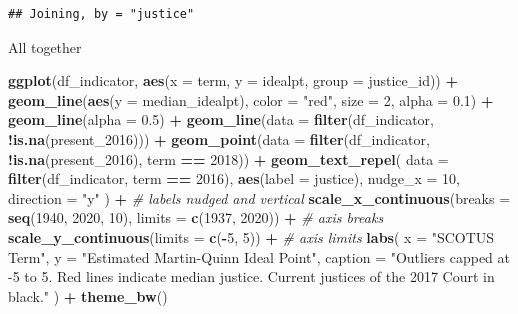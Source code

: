 \documentclass[
]{book}
\newenvironment{Shaded}{\begin{snugshade}}{\end{snugshade}}
\newcommand{\CommentTok}[1]{\textcolor[rgb]{0.56,0.35,0.01}{\textit{#1}}}
\newcommand{\DataTypeTok}[1]{\textcolor[rgb]{0.13,0.29,0.53}{#1}}
\newcommand{\DecValTok}[1]{\textcolor[rgb]{0.00,0.00,0.81}{#1}}
\newcommand{\FloatTok}[1]{\textcolor[rgb]{0.00,0.00,0.81}{#1}}
\newcommand{\KeywordTok}[1]{\textcolor[rgb]{0.13,0.29,0.53}{\textbf{#1}}}
\newcommand{\NormalTok}[1]{#1}
\newcommand{\OperatorTok}[1]{\textcolor[rgb]{0.81,0.36,0.00}{\textbf{#1}}}
\newcommand{\StringTok}[1]{\textcolor[rgb]{0.31,0.60,0.02}{#1}}
\theoremstyle{definition}
\theoremstyle{definition}
\theoremstyle{definition}
\theoremstyle{definition}
\theoremstyle{remark}
\begin{document}
\begin{verbatim}
## Joining, by = "justice"
\end{verbatim}

All together

\begin{Shaded}
\begin{Highlighting}[]
\KeywordTok{ggplot}\NormalTok{(df_indicator, }\KeywordTok{aes}\NormalTok{(}\DataTypeTok{x =}\NormalTok{ term, }\DataTypeTok{y =}\NormalTok{ idealpt, }\DataTypeTok{group =}\NormalTok{ justice_id)) }\OperatorTok{+}
\StringTok{  }\KeywordTok{geom_line}\NormalTok{(}\KeywordTok{aes}\NormalTok{(}\DataTypeTok{y =}\NormalTok{ median_idealpt), }\DataTypeTok{color =} \StringTok{"red"}\NormalTok{, }\DataTypeTok{size =} \DecValTok{2}\NormalTok{, }\DataTypeTok{alpha =} \FloatTok{0.1}\NormalTok{) }\OperatorTok{+}
\StringTok{  }\KeywordTok{geom_line}\NormalTok{(}\DataTypeTok{alpha =} \FloatTok{0.5}\NormalTok{) }\OperatorTok{+}
\StringTok{  }\KeywordTok{geom_line}\NormalTok{(}\DataTypeTok{data =} \KeywordTok{filter}\NormalTok{(df_indicator, }\OperatorTok{!}\KeywordTok{is.na}\NormalTok{(present_}\DecValTok{2016}\NormalTok{))) }\OperatorTok{+}
\StringTok{  }\KeywordTok{geom_point}\NormalTok{(}\DataTypeTok{data =} \KeywordTok{filter}\NormalTok{(df_indicator, }\OperatorTok{!}\KeywordTok{is.na}\NormalTok{(present_}\DecValTok{2016}\NormalTok{), term }\OperatorTok{==}\StringTok{ }\DecValTok{2018}\NormalTok{)) }\OperatorTok{+}
\StringTok{  }\KeywordTok{geom_text_repel}\NormalTok{(}
    \DataTypeTok{data =} \KeywordTok{filter}\NormalTok{(df_indicator, term }\OperatorTok{==}\StringTok{ }\DecValTok{2016}\NormalTok{), }\KeywordTok{aes}\NormalTok{(}\DataTypeTok{label =}\NormalTok{ justice),}
    \DataTypeTok{nudge_x =} \DecValTok{10}\NormalTok{,}
    \DataTypeTok{direction =} \StringTok{"y"}
\NormalTok{  ) }\OperatorTok{+}\StringTok{ }\CommentTok{# labels nudged and vertical}
\StringTok{  }\KeywordTok{scale_x_continuous}\NormalTok{(}\DataTypeTok{breaks =} \KeywordTok{seq}\NormalTok{(}\DecValTok{1940}\NormalTok{, }\DecValTok{2020}\NormalTok{, }\DecValTok{10}\NormalTok{), }\DataTypeTok{limits =} \KeywordTok{c}\NormalTok{(}\DecValTok{1937}\NormalTok{, }\DecValTok{2020}\NormalTok{)) }\OperatorTok{+}\StringTok{ }\CommentTok{# axis breaks}
\StringTok{  }\KeywordTok{scale_y_continuous}\NormalTok{(}\DataTypeTok{limits =} \KeywordTok{c}\NormalTok{(}\OperatorTok{-}\DecValTok{5}\NormalTok{, }\DecValTok{5}\NormalTok{)) }\OperatorTok{+}\StringTok{ }\CommentTok{# axis limits}
\StringTok{  }\KeywordTok{labs}\NormalTok{(}
    \DataTypeTok{x =} \StringTok{"SCOTUS Term"}\NormalTok{,}
    \DataTypeTok{y =} \StringTok{"Estimated Martin-Quinn Ideal Point"}\NormalTok{,}
    \DataTypeTok{caption =} \StringTok{"Outliers capped at -5 to 5. Red lines indicate median justice. Current justices of the 2017 Court in black."}
\NormalTok{  ) }\OperatorTok{+}
\StringTok{  }\KeywordTok{theme_bw}\NormalTok{()}
\end{Highlighting}
\end{Shaded}
\end{document}
